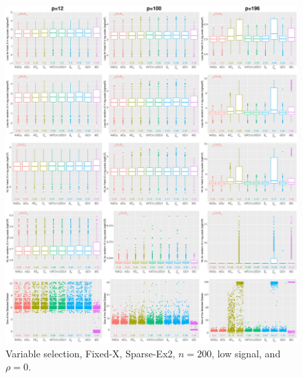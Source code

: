 \begin{figure}[!ht]
\centering
\includegraphics[width=\textwidth]{figures/supplement/fixedx/subset_selection/Sparse-Ex2_n200_lsnr_rho0.eps}
\caption{Variable selection, Fixed-X, Sparse-Ex2, $n=200$, low signal, and $\rho=0$.}
\end{figure}
\clearpage
